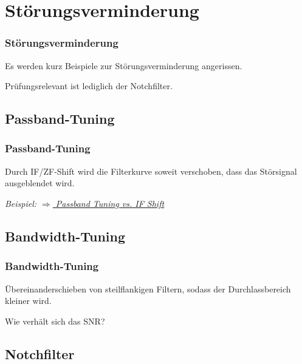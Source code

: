 \section[Störungsverm.]{Störungsverminderung}

\begin{frame}
  \frametitle{Störungsverminderung}

  Es werden kurz Beispiele zur Störungsverminderung angerissen.

  \bigskip

  Prüfungsrelevant ist lediglich der Notchfilter.

\end{frame}

\subsection{Passband-Tuning}

\begin{frame}
  \frametitle{Passband-Tuning}

  Durch IF/ZF-Shift wird die Filterkurve soweit verschoben, dass das
  Störsignal ausgeblendet wird.

  \bigskip

  \emph{Beispiel: \href{https://youtu.be/NnhZbAKXm28}{$\Rightarrow$ Passband Tuning vs. IF Shift}}

\end{frame}

\subsection{Bandwidth-Tuning}

\begin{frame}
  \frametitle{Bandwidth-Tuning}

  Übereinanderschieben von steilflankigen Filtern, sodass der
  Durchlassbereich kleiner wird.


  \bigskip

  Wie verhält sich das SNR?

\end{frame}

\subsection{Notchfilter}

